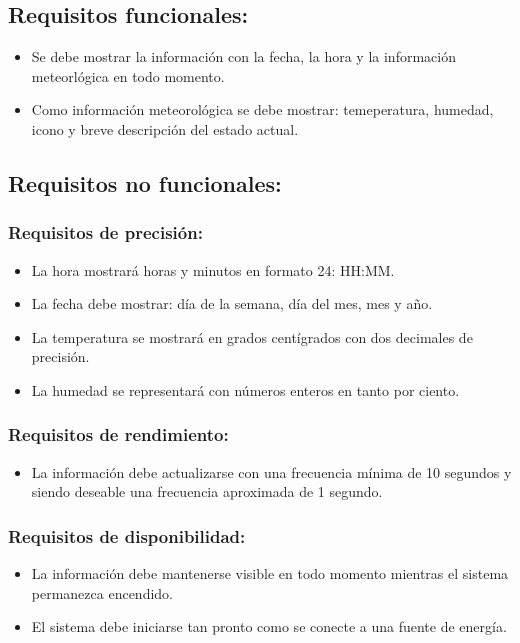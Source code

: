 \subsection{Requisitos funcionales:}
\begin{itemize}
    \item Se debe mostrar la información con la fecha, la hora y la información meteorlógica
    en todo momento.
    \item Como información meteorológica se debe mostrar: temeperatura, humedad, icono
    y breve descripción del estado actual.
\end{itemize}

\subsection{Requisitos no funcionales:}

\subsubsection{Requisitos de precisión:}
\begin{itemize}
    \item La hora mostrará horas y minutos en formato 24: HH:MM.
    \item La fecha debe mostrar: día de la semana, día del mes, mes y año.
    \item La temperatura se mostrará en grados centígrados con dos decimales de precisión.
    \item La humedad se representará con números enteros en tanto por ciento.
\end{itemize}

\subsubsection{Requisitos de rendimiento:}
\begin{itemize}
    \item La información debe actualizarse con una frecuencia mínima de 10 segundos y
    siendo deseable una frecuencia aproximada de 1 segundo.
\end{itemize}

\subsubsection{Requisitos de disponibilidad:}
\begin{itemize}
    \item La información debe mantenerse visible en todo momento mientras el sistema
    permanezca encendido.
    \item El sistema debe iniciarse tan pronto como se conecte a una fuente de energía.
\end{itemize}

